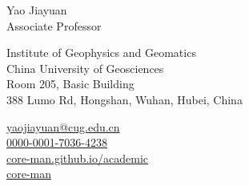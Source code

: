 \documentclass[11pt,a4paper]{article}
\makeatletter
\newcommand{\Name}{Yao Jiayuan}
\newcommand{\Role}{Associate Professor}
\newcommand{\Email}{yaojiayuan@cug.edu.cn}
\newcommand{\Website}{core-man.github.io/academic}
\newcommand{\Github}{core-man}
\newcommand{\Orcid}{0000-0001-7036-4238}
\newcommand{\Affiliation}{Institute of Geophysics and Geomatics \\ China University of Geosciences}
\newcommand{\Address}{Room 205, Basic Building \\ 388 Lumo Rd, Hongshan, Wuhan, Hubei, China}
\makeatother
\begin{document}
\thispagestyle{empty} %
{
\begin{center}
{\fontsize{24pt}{0}\selectfont \Name \hspace{1ex}} \\[0.4cm]
{\fontsize{16pt}{0}\selectfont \Role} \\[0.2cm]
\end{center}
\begin{minipage}[t]{0.6\textwidth}
  \fontsize{12pt}{15pt}\selectfont
  \Affiliation
  \\
  \Address
\end{minipage}
\begin{minipage}[t]{0.4\textwidth}
  \fontsize{12pt}{15pt}\selectfont
  \begin{flushleft}
    \faEnvelope \href{mailto:\Email}{\Email}
	\\
	\faOrcid \href{https://orcid.org/\Orcid}{\Orcid}
	\\
    \faGlobe \href{https://\Website}{\Website}
	\\
	\faGithub \href{https://github.com/\Github}{\Github}
  \end{flushleft}
\end{minipage}
}
\vspace{0.2cm}












\end{document}
